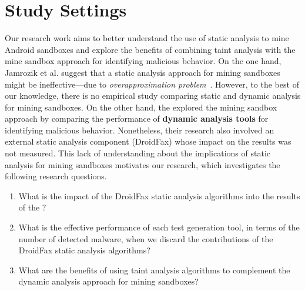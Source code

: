 \section{Study Settings}


Our research work aims to better understand
the use of static analysis to mine Android sandboxes
and explore the benefits of combining taint analysis
with the mine sandbox approach for identifying malicious
behavior. 
On the one hand, Jamrozik et al. suggest that a 
static analysis approach for mining sandboxes
might be ineffective---due to \emph{overapproximation
problem}~\cite{DBLP:conf/icse/JamrozikSZ16The}.
However, to the best of our knowledge,
there is no empirical study comparing
static and dynamic analysis for mining sandboxes.
On the other hand, the \blls explored the mining sandbox approach by comparing
the performance of {\bf dynamic analysis tools} for identifying
malicious behavior. Nonetheless, their
research also involved an external static analysis component (DroidFax)
whose impact on the results was not measured.
This lack of understanding about the implications of
static analysis for mining sandboxes motivates
our research, which investigates the following research questions.

\begin{enumerate}[(RQ1)]
 
 \item What is the impact of the DroidFax static analysis algorithms into the results of the \blls?
  
 \item What is the effective performance of each test generation tool, in terms of the number of detected malware, when we
   discard the contributions of the DroidFax static analysis algorithms?

 \item What are the benefits of using taint
 analysis algorithms to complement the dynamic analysis approach for mining sandboxes?
\end{enumerate}


